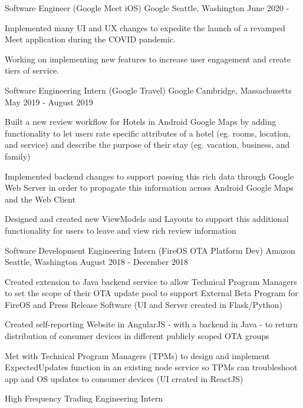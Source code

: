 \documentclass[
    changecolor={0, 38, 58},
]{pranav-resume}
\begin{document}
\cventry
  {Software Engineer (Google Meet iOS)}
  {Google}
  {Seattle, Washington}
  {June 2020 - }
  {
    \begin{cvitems}
        \item {Implemented many UI and UX changes to expedite the launch of a revamped Meet application during the COVID pandemic.}
        \item {Working on implementing new features to increase user engagement and create tiers of service.}
  \end{cvitems}
  }
\cventry
  {Software Engineering Intern (Google Travel)}
  {Google}
  {Cambridge, Massachusetts}
  {May 2019 - August 2019}
  {
    \begin{cvitems}
        \item {Built a new review workflow for Hotels in Android Google Maps by adding functionality to let users rate specific attributes of a hotel (eg. rooms, location, and service) and describe the purpose of their stay (eg. vacation, business, and family)}
        \item {Implemented backend changes to support passing this rich data through Google Web Server in order to propagate this information across Android Google Maps and the Web Client}
        \item {Designed and created new ViewModels and Layouts to support this additional functionality for users to leave and view rich review information}
  \end{cvitems}
  }
\cventry
  {Software Development Engineering Intern (FireOS OTA Platform Dev)}
  {Amazon}
  {Seattle, Washington}
  {August 2018 - December 2018}
  {
    \begin{cvitems}
     \item {Created extension to Java backend service to allow Technical Program Managers to set the scope of their OTA update pool to support External Beta Program for FireOS and Press Release Software (UI and Server created in Flask/Python) }
	\item {Created self-reporting Website in AngularJS - with a backend in Java - to return distribution of consumer devices in different publicly scoped OTA groups }
	\item {Met with Technical Program Managers (TPMs) to design and implement ExpectedUpdates function in an existing node service so TPMs can troubleshoot app and OS updates to consumer devices (UI created in ReactJS)}
    \end{cvitems}
  }
\cventry
  {High Frequency Trading Engineering Intern}
\end{document}
